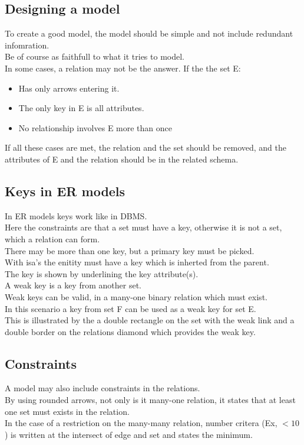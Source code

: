 \documentclass[12pt, a4paper]{article}
\begin{document}
		\subsection{Designing a model}
			To create a good model, the model should be simple and not include redundant infomration.\\
			Be of course as faithfull to what it tries to model.\\
			In some cases, a relation may not be the answer. If the the set E:
			\begin{itemize}
						\item Has only arrows entering it.
						\item The only key in E is all attributes.
						\item No relationship involves E more than once
			\end{itemize}
			If all these cases are met, the relation and the set should be removed, and the attributes of E and the relation should be in the related schema.\\

			
		\subsection{Keys in ER models}
			In ER models keys work like in DBMS.\\
			Here the constraints are that a set must have a key, otherwise it is not a set, which a relation can form.\\
			There may be more than one key, but a primary key must be picked.\\
			With isa's the enitity must have a key which is inherted from the parent.\\
			The key is shown by underlining the key attribute(s).\\
			A weak key is a key from another set.\\
			Weak keys can be valid, in a many-one binary relation which must exist.\\
			In this scenario a key from set F can be used as a weak key for set E.\\
			This is illustrated by the a double rectangle on the set with the weak link and a double border on the relations diamond which provides the weak key.
		\subsection{Constraints}
			A model may also include constraints in the relations.\\
			By using rounded arrows, not only is it many-one relation, it states that at least one set must exists in the relation.\\
			In the case of a restriction on the many-many relation, number critera (Ex, $<10$) is written at the intersect of edge and set and states the minimum.
\end{document}
